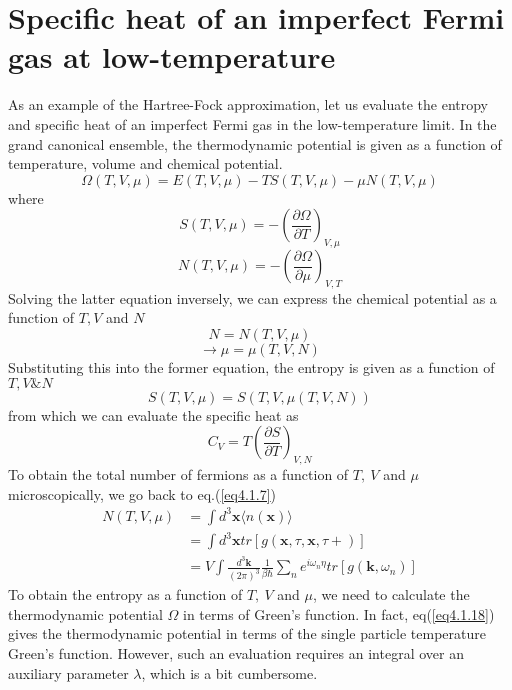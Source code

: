 \section{Specific heat of an imperfect Fermi gas at low-temperature}
%
As an example of the Hartree-Fock approximation, let us evaluate the entropy and specific heat of an imperfect Fermi gas in the low-temperature limit.
In the grand canonical ensemble, the thermodynamic potential is given as a function of temperature, volume and chemical potential.
\begin{equation}
\Omega(T,V,\mu)=E(T,V,\mu)-TS(T,V,\mu)-\mu N(T,V,\mu)
\end{equation}
where
\begin{equation}\label{eq4.6.2}
S(T,V,\mu)=-\left( \frac{\partial\Omega}{\partial T}\right)_{V,\mu}
\end{equation}
\begin{equation}
N(T,V,\mu)=-\left( \frac{\partial\Omega}{\partial \mu}\right)_{V,T}
\end{equation}
Solving the latter equation inversely, we can express the chemical potential as a function of $T,V$ and $N$
\[
N=N(T,V,\mu)
\]
\[
\rightarrow \mu=\mu(T,V,N)
\]
Substituting this into the former equation, the entropy is given as a function of $T,V \& N$
\[
S(T,V,\mu)=S(T,V,\mu(T,V,N))
\]
from which we can evaluate the specific heat as 
\begin{equation}
C_V=T\left(\frac{\partial S}{\partial T}\right)_{V,N}
\end{equation}
To obtain the total number of fermions as a function of $T,\ V$ and $\mu$ microscopically, we go back to eq.(\ref{eq4.1.7})
\begin{equation}\label{eq4.6.5}
\begin{aligned}
N(T,V,\mu)&=\int d^3 \mathbf{x} \langle n(\mathbf{x})\rangle\\
&=\int d^3 \mathbf{x} tr[g(\mathbf{x},\tau,\mathbf{x},\tau+)]\\
&=V\int \frac{d^3\mathbf{k}}{(2\pi)^3} \frac{1}{\beta\hbar}\sum_n e^{i\omega_n\eta} tr[g(\mathbf{k},\omega_n)]
\end{aligned}
\end{equation}
To obtain the entropy as a function of $T,\ V$ and $\mu$, we need to calculate the thermodynamic potential $\Omega$ in terms of Green's function.
In fact, eq(\ref{eq4.1.18}) gives the thermodynamic potential in terms of the single particle temperature Green's function.
However, such an evaluation requires an integral over an auxiliary parameter $\lambda$, which is a bit cumbersome.
